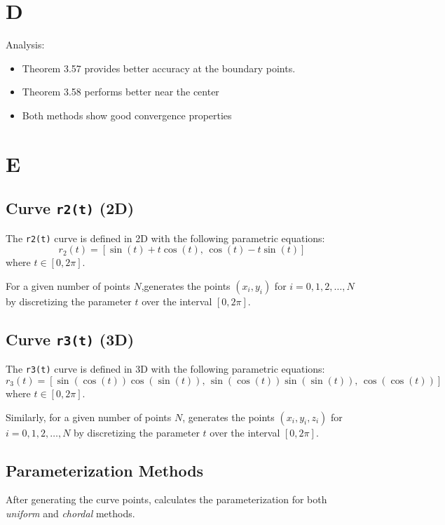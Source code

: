 \documentclass[a4paper]{article}
\begin{document}
\section*{D}
Analysis:
\begin{itemize}
    \item Theorem 3.57 provides better accuracy at the boundary points.
    \item Theorem 3.58 performs better near the center
    \item Both methods show good convergence properties
\end{itemize}

\section*{E}
\subsection*{Curve \texttt{r2(t)} (2D)}

The \texttt{r2(t)} curve is defined in 2D with the following parametric equations:
\[
r_2(t) = \left[ \sin(t) + t \cos(t), \, \cos(t) - t \sin(t) \right]
\]
where \( t \in [0, 2\pi] \).

For a given number of points \( N \),generates the points \( (x_i, y_i) \) for \( i = 0, 1, 2, \dots, N \) by discretizing the parameter \( t \) over the interval \( [0, 2\pi] \).

\subsection*{Curve \texttt{r3(t)} (3D)}

The \texttt{r3(t)} curve is defined in 3D with the following parametric equations:
\[
r_3(t) = \left[ \sin(\cos(t)) \cos(\sin(t)), \, \sin(\cos(t)) \sin(\sin(t)), \, \cos(\cos(t)) \right]
\]
where \( t \in [0, 2\pi] \).

Similarly, for a given number of points \( N \), generates the points \( (x_i, y_i, z_i) \) for \( i = 0, 1, 2, \dots, N \) by discretizing the parameter \( t \) over the interval \( [0, 2\pi] \).

\subsection*{ Parameterization Methods}

After generating the curve points,  calculates the parameterization for both \textit{uniform} and \textit{chordal} methods.
\end{document}
